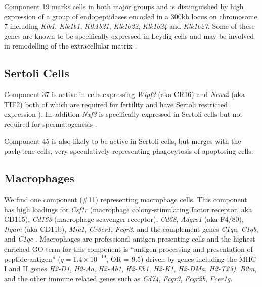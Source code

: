 Component 19 marks cells in both major groups and is distinguished by high expression of a group of endopeptidases encoded in a 300kb locus on chromosome 7 including \textit{Klk1}, \textit{Klk1b1}, \textit{Klk1b21}, \textit{Klk1b22}, \textit{Klk1b24} and \textit{Klk1b27}. Some of these genes are known to be specifically expressed in Leydig cells and may be involved in remodelling of the extracellular matrix \parencite{Sanz2013RiboTag, Matsui2000Cloning, Matsui2001Mouse, Matsui2005Characterization}.

\subsection{Sertoli Cells}

Component 37 is active in cells expressing \textit{Wipf3} (aka CR16) and \textit{Ncoa2} (aka TIF2) both of which are required for fertility and have Sertoli restricted expression \parencite{Suetsugu2007Malespecific, Gehin2002Function}). In addition \textit{Nxf3} is specifically expressed in Sertoli cells but not required for spermatogenesis \parencite{Zhou2011Nxf3}.

Component 45 is also likely to be active in Sertoli cells, but merges with the pachytene cells, very speculatively representing phagocytosis of apoptosing cells.


\subsection{Macrophages}
We find one component (\#11) representing macrophage cells. This component has high loadings for \textit{Csf1r} (macrophage colony-stimulating factor receptor, aka CD115), \textit{Cd163} (macrophage scavenger receptor), \textit{Cd68}, \textit{Adgre1} (aka F4/80), \textit{Itgam} (aka CD11b), \textit{Mrc1}, \textit{Cx3cr1}, \textit{Fcgr3}, and the complement genes \textit{C1qa}, \textit{C1qb}, and \textit{C1qc} \parencite{Mossadegh-Keller2017Developmental, Fabriek2005macrophage, Sasmono2012Generation}. Macrophages are professional antigen-presenting cells and the highest enriched GO term for this component is ``antigen processing and presentation of peptide antigen'' ($q = 1.4\times10^{-19}$, OR = 9.5) driven by genes including the MHC I and II genes \textit{H2-D1}, \textit{H2-Aa}, \textit{H2-Ab1}, \textit{H2-Eb1}, \textit{H2-K1}, \textit{H2-DMa}, \textit{H2-T23)}, \textit{B2m}, and the other immune related genes such as \textit{Cd74}, \textit{Fcgr3}, \textit{Fcgr2b}, \textit{Fcer1g}.

